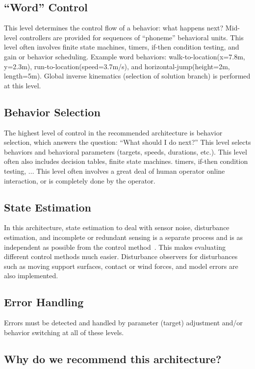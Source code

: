 \documentclass[letterpaper,12pt,fullpage]{article}
\begin{document}
\subsection{``Word'' Control}

This level determines the control flow of a behavior: what happens next?
Mid-level controllers are provided for sequences of ``phoneme'' behavioral
units.
This level often involves finite state machines, timers, if-then condition testing,
and gain or behavior
scheduling.
Example word behaviors: walk-to-location(x=7.8m, y=2.3m), run-to-location(speed=3.7m/s),
and horizontal-jump(height=2m, length=5m).
Global inverse kinematics (selection of solution branch) is performed at this level.

\subsection{Behavior Selection}

The highest level of control in the recommended architecture is behavior selection,
which answers the question:
``What should I do next?''
This level selects behaviors and behavioral parameters (targets,
speeds, durations, etc.).
This level often also 
includes decision tables, finite state machines. timers, if-then condition testing, ...
This level often involves a great deal of human operator online interaction,
or is completely done by the operator.

\subsection{State Estimation}

In this architecture, state estimation to deal with sensor noise,
disturbance estimation, and incomplete or
redundant sensing is a separate process and is as independent as possible
from the control method~\cite{certainty-eq,separation-prin}.
This makes evaluating different control methods much easier.
Disturbance observers for disturbances such as
moving support surfaces, contact or wind forces, and model errors
are also implemented.

\subsection{Error Handling}

Errors must be detected and handled by parameter (target)
adjustment and/or behavior switching
at all of these levels.

\subsection{Why do we recommend this architecture?}
\end{document}
